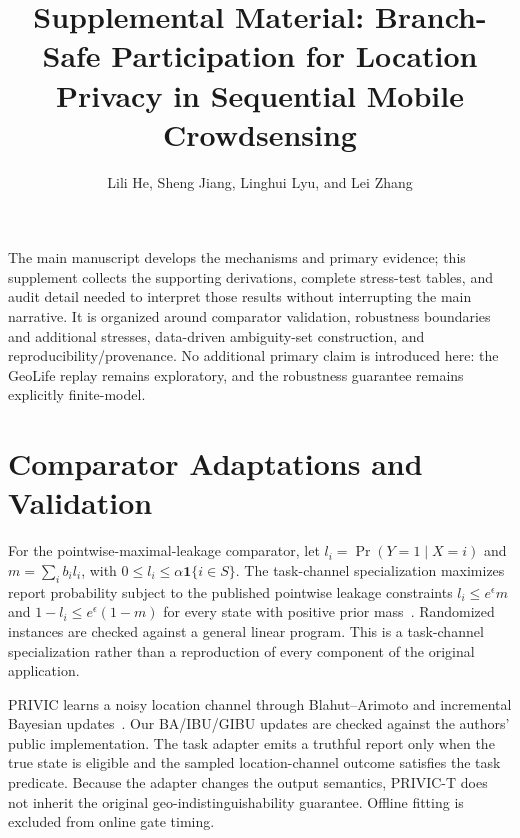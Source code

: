 \documentclass[10pt,journal,compsoc]{IEEEtran}
\begin{document}
\title{Supplemental Material: Branch-Safe Participation for Location Privacy in Sequential Mobile Crowdsensing}

\author{Lili He, Sheng Jiang, Linghui Lyu, and Lei Zhang%
}

\maketitle

The main manuscript develops the mechanisms and primary evidence; this supplement collects the supporting derivations, complete stress-test tables, and audit detail needed to interpret those results without interrupting the main narrative. It is organized around comparator validation, robustness boundaries and additional stresses, data-driven ambiguity-set construction, and reproducibility/provenance. No additional primary claim is introduced here: the GeoLife replay remains exploratory, and the robustness guarantee remains explicitly finite-model.

\section{Comparator Adaptations and Validation}
For the pointwise-maximal-leakage comparator, let \(l_i=\Pr(Y=1\mid X=i)\) and \(m=\sum_i b_i l_i\), with \(0\le l_i\le\alpha\mathbf{1}\{i\in S\}\). The task-channel specialization maximizes report probability subject to the published pointwise leakage constraints \(l_i\le e^\epsilon m\) and \(1-l_i\le e^\epsilon(1-m)\) for every state with positive prior mass~\cite{pml2024}. Randomized instances are checked against a general linear program. This is a task-channel specialization rather than a reproduction of every component of the original application.

PRIVIC learns a noisy location channel through Blahut--Arimoto and incremental Bayesian updates~\cite{privic2024}. Our BA/IBU/GIBU updates are checked against the authors' public implementation. The task adapter emits a truthful report only when the true state is eligible and the sampled location-channel outcome satisfies the task predicate. Because the adapter changes the output semantics, PRIVIC-T does not inherit the original geo-indistinguishability guarantee. Offline fitting is excluded from online gate timing.
\end{document}
